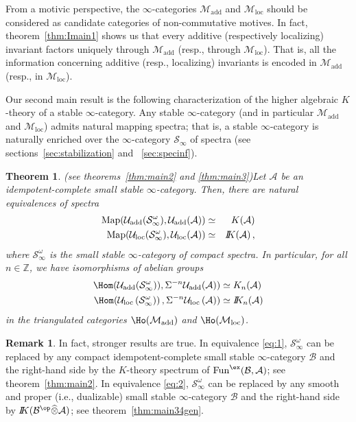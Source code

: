 \documentclass{amsart}
\newcommand{\cA}{{\mathcal A}}
\newcommand{\cM}{{\mathcal M}}
\newcommand{\cU}{{\mathcal U}}
\let\catsymbfont\mathcal
\newcommand{\aA}{{\catsymbfont{A}}}
\newcommand{\aB}{{\catsymbfont{B}}}
\newcommand{\aS}{{\catsymbfont{S}}}
\newcommand{\bbK}{I\mspace{-6.mu}K}
\newcommand{\bbZ}{\mathbb{Z}}
\newcommand{\idemtimes}{\widehat{\otimes}}
\newcommand{\Fun}{\mathrm{Fun}} %
\newcommand{\Map}{\mathrm{Map}}%
\newcommand{\ispec}{\aS_{\infty}}
\renewcommand{\i}{\infty}
\newcommand{\Motadd}{\cM_{\mathrm{add}}}
\newcommand{\Motloc}{\cM_\mathrm{loc}}
\newcommand{\Umot}{\cU_{\mathrm{add}}}
\newcommand{\Uloc}{\cU_{\mathrm{loc}}}
\numberwithin{equation}{section}
\newtheorem{theorem}[equation]{Theorem}
\theoremstyle{definition}
\newtheorem{remark}[equation]{Remark}
\begin{document}
From a motivic perspective, the $\i$-categories $\Motadd$ and
$\Motloc$ should be considered as candidate categories of
non-commutative motives.  In fact, theorem~\ref{thm:Imain1} shows us
that every additive (respectively localizing) invariant factors
uniquely through $\Motadd$ (resp., through $\Motloc$).  That is, all the
information concerning additive (resp., localizing) invariants is encoded in
$\Motadd$ (resp., in $\Motloc$).

Our second main result is the following characterization of the higher
algebraic $K$-theory of a stable $\i$-category.  Any
stable $\i$-category (and in particular $\Motadd$ and $\Motloc$)
admits natural mapping spectra; that is, a stable $\i$-category is
naturally enriched over the $\i$-category $\ispec$ of spectra (see
sections~\ref{sec:stabilization} and ~\ref{sec:specinf}).

\begin{theorem}{(see theorems~\ref{thm:main2} and \ref{thm:main3})}\label{thm:Imain2}
Let $\aA$ be an idempotent-complete small stable $\i$-category. Then,
there are natural equivalences of spectra   
\begin{eqnarray}
\Map(\Umot(\ispec^{\omega}), \Umot(\aA)) &\simeq& K(\aA) \label{eq:1} \\
\Map(\Uloc(\ispec^{\omega}), \Uloc(\aA)) &\simeq& \bbK(\aA)  \label{eq:2} \,,
\end{eqnarray}
where $\ispec^{\omega}$ is the small stable $\i$-category of
compact spectra. In particular, for all $n\in\bbZ$, we have isomorphisms of abelian groups
\begin{align}
\Hom(\Umot(\ispec^{\omega})), \Sigma^{-n}\Umot(\cA)) &\simeq K_n(\cA)\\
\Hom(\Uloc\,(\ispec^{\omega}))\,, \Sigma^{-n}\Uloc\,(\cA)) &\simeq \bbK_n(\cA)
\end{align}
in the triangulated categories $\Ho(\Motadd)$ and $\Ho(\Motloc)$. 
\end{theorem}

\begin{remark}\label{rk:stronger}
In fact, stronger results are true.  In equivalence \eqref{eq:1},
$\ispec^\omega$ can be replaced by any compact idempotent-complete 
small stable $\i$-category $\aB$ and the right-hand side by the
$K$-theory spectrum of $\Fun^{\ex}(\aB,\aA)$; see
theorem~\ref{thm:main2}. In equivalence \eqref{eq:2}, $\ispec^{\omega}$
can be replaced by any smooth and proper (i.e., dualizable) small
stable $\i$-category $\aB$ and the right-hand side by
$\bbK(\aB^{\op}  \idemtimes \aA)$; see theorem~\ref{thm:main34gen}.
\end{remark}
\end{document}
